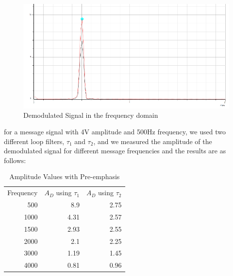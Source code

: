 \documentclass[12pt]{article}
\begin{document}
\begin{figure}[H] 
    \centering
    \includegraphics[width=1\textwidth]{assets/d_f.png}
    \caption{Demodulated Signal in the frequency domain}
\end{figure}
for a message signal with 4V amplitude and 500Hz frequency, we used two different loop filters, $\tau_1$ and $\tau_2$, and we measured the amplitude of the demodulated signal for different message frequencies and the results are as follows:
\begin{table}[H]
    \centering
    \begin{tabular}{|r|r|r|}
    \cline{1-3}
    \multicolumn{1}{|l|}{Frequency} & \multicolumn{1}{l|}{$A_D$ using $\tau_1$} & \multicolumn{1}{l|}{$A_D$ using $\tau_2$} \\
    \cline{1-3}
    500  & 8.9  & 2.75 \\
    1000 & 4.31 & 2.57 \\
    1500 & 2.93 & 2.55 \\
    2000 & 2.1  & 2.25 \\
    3000 & 1.19 & 1.45 \\
    4000 & 0.81 & 0.96 \\
    \cline{1-3}
    \end{tabular}
    \caption{Amplitude Values with Pre-emphasis}
\end{table}
\end{document}
